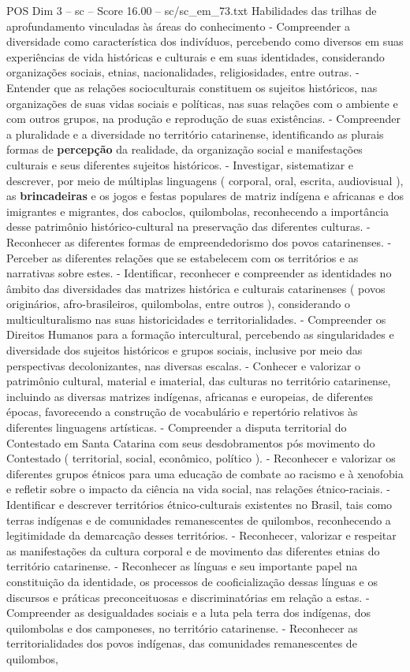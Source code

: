 \begin{textsample}{POS Dim 3 – sc – Score 16.00 – sc/sc\_em\_73.txt}
Habilidades das trilhas de aprofundamento vinculadas às áreas do conhecimento - Compreender a diversidade como característica dos indivíduos, percebendo como diversos em suas experiências de vida históricas e culturais e em suas identidades, considerando organizações sociais, etnias, nacionalidades, religiosidades, entre outras. - Entender que as relações socioculturais constituem os sujeitos históricos, nas organizações de suas vidas sociais e políticas, nas suas relações com o ambiente e com outros grupos, na produção e reprodução de suas existências. - Compreender a pluralidade e a diversidade no território catarinense, identificando as plurais formas de \textbf{percepção} da realidade, da organização social e manifestações culturais e seus diferentes sujeitos históricos. - Investigar, sistematizar e descrever, por meio de múltiplas linguagens ( corporal, oral, escrita, audiovisual ), as \textbf{brincadeiras} e os jogos e festas populares de matriz indígena e africanas e dos imigrantes e migrantes, dos caboclos, quilombolas, reconhecendo a importância desse patrimônio histórico-cultural na preservação das diferentes culturas. - Reconhecer as diferentes formas de empreendedorismo dos povos catarinenses. - Perceber as diferentes relações que se estabelecem com os territórios e as narrativas sobre estes. - Identificar, reconhecer e compreender as identidades no âmbito das diversidades das matrizes histórica e culturais catarinenses ( povos originários, afro-brasileiros, quilombolas, entre outros ), considerando o multiculturalismo nas suas historicidades e territorialidades. - Compreender os Direitos Humanos para a formação intercultural, percebendo as singularidades e diversidade dos sujeitos históricos e grupos sociais, inclusive por meio das perspectivas decolonizantes, nas diversas escalas. - Conhecer e valorizar o patrimônio cultural, material e imaterial, das culturas no território catarinense, incluindo as diversas matrizes indígenas, africanas e europeias, de diferentes épocas, favorecendo a construção de vocabulário e repertório relativos às diferentes linguagens artísticas. - Compreender a disputa territorial do Contestado em Santa Catarina com seus desdobramentos pós movimento do Contestado ( territorial, social, econômico, político ). - Reconhecer e valorizar os diferentes grupos étnicos para uma educação de combate ao racismo e à xenofobia e refletir sobre o impacto da ciência na vida social, nas relações étnico-raciais. - Identificar e descrever territórios étnico-culturais existentes no Brasil, tais como terras indígenas e de comunidades remanescentes de quilombos, reconhecendo a legitimidade da demarcação desses territórios. - Reconhecer, valorizar e respeitar as manifestações da cultura corporal e de movimento das diferentes etnias do território catarinense. - Reconhecer as línguas e seu importante papel na constituição da identidade, os processos de cooficialização dessas línguas e os discursos e práticas preconceituosas e discriminatórias em relação a estas. - Compreender as desigualdades sociais e a luta pela terra dos indígenas, dos quilombolas e dos camponeses, no território catarinense. - Reconhecer as territorialidades dos povos indígenas, das comunidades remanescentes de quilombos, 
\end{textsample}

